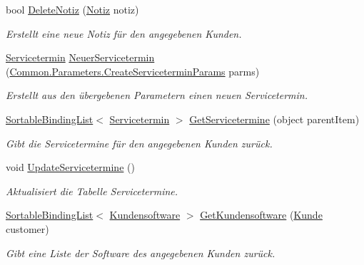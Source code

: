 \begin{DoxyCompactItemize}
\item 
bool \hyperlink{class_products_1_1_model_1_1_model_service_aca035be2633b2a31c67051595aa43ffa}{Delete\+Notiz} (\hyperlink{class_products_1_1_model_1_1_entities_1_1_notiz}{Notiz} notiz)
\begin{DoxyCompactList}\small\item\em Erstellt eine neue Notiz für den angegebenen Kunden. \end{DoxyCompactList}\item 
\hyperlink{class_products_1_1_model_1_1_entities_1_1_servicetermin}{Servicetermin} \hyperlink{class_products_1_1_model_1_1_model_service_a558a7a4e4b2a669a15e35aadd390ce83}{Neuer\+Servicetermin} (\hyperlink{class_products_1_1_common_1_1_parameters_1_1_create_servicetermin_params}{Common.\+Parameters.\+Create\+Servicetermin\+Params} parms)
\begin{DoxyCompactList}\small\item\em Erstellt aus den übergebenen Parametern einen neuen Servicetermin. \end{DoxyCompactList}\item 
\hyperlink{class_products_1_1_common_1_1_sortable_binding_list}{Sortable\+Binding\+List}$<$ \hyperlink{class_products_1_1_model_1_1_entities_1_1_servicetermin}{Servicetermin} $>$ \hyperlink{class_products_1_1_model_1_1_model_service_ad4b6756926f2f69a3f1eeb4a4be30ffe}{Get\+Servicetermine} (object parent\+Item)
\begin{DoxyCompactList}\small\item\em Gibt die Servicetermine für den angegebenen Kunden zurück. \end{DoxyCompactList}\item 
void \hyperlink{class_products_1_1_model_1_1_model_service_ae10ee64975cda02766b56da7a6980387}{Update\+Servicetermine} ()
\begin{DoxyCompactList}\small\item\em Aktualisiert die Tabelle Servicetermine. \end{DoxyCompactList}\item 
\hyperlink{class_products_1_1_common_1_1_sortable_binding_list}{Sortable\+Binding\+List}$<$ \hyperlink{class_products_1_1_model_1_1_entities_1_1_kundensoftware}{Kundensoftware} $>$ \hyperlink{class_products_1_1_model_1_1_model_service_a66c0c4c484d85adb24f0d0381fdc6d8c}{Get\+Kundensoftware} (\hyperlink{class_products_1_1_model_1_1_entities_1_1_kunde}{Kunde} customer)
\begin{DoxyCompactList}\small\item\em Gibt eine Liste der Software des angegebenen Kunden zurück. \end{DoxyCompactList}\item 

\end{DoxyCompactItemize}
